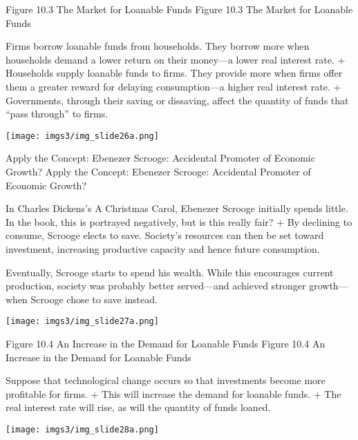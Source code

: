 \documentclass[
  12pt,
  ignorenonframetext,
]{beamer}
\begin{document}
\begin{frame}{Figure 10.3 The Market for Loanable Funds}
\protect\hypertarget{figure-10.3-the-market-for-loanable-funds}{}
Figure 10.3 The Market for Loanable Funds

Firms borrow loanable funds from households. They borrow more when
households demand a lower return on their money---a lower real interest
rate. + Households supply loanable funds to firms. They provide more
when firms offer them a greater reward for delaying consumption---a
higher real interest rate. + Governments, through their saving or
dissaving, affect the quantity of funds that ``pass through'' to firms.

\texttt{[image: imgs3/img\_slide26a.png]}
\end{frame}

\begin{frame}{Apply the Concept: Ebenezer Scrooge: Accidental Promoter
of Economic Growth?}
\protect\hypertarget{apply-the-concept-ebenezer-scrooge-accidental-promoter-of-economic-growth}{}
Apply the Concept: Ebenezer Scrooge: Accidental Promoter of Economic
Growth?

In Charles Dickens's A Christmas Carol, Ebenezer Scrooge initially
spends little. In the book, this is portrayed negatively, but is this
really fair? + By declining to consume, Scrooge elects to save.
Society's resources can then be set toward investment, increasing
productive capacity and hence future consumption.

Eventually, Scrooge starts to spend his wealth. While this encourages
current production, society was probably better served---and achieved
stronger growth---when Scrooge chose to save instead.

\texttt{[image: imgs3/img\_slide27a.png]}
\end{frame}

\begin{frame}{Figure 10.4 An Increase in the Demand for Loanable Funds}
\protect\hypertarget{figure-10.4-an-increase-in-the-demand-for-loanable-funds}{}
Figure 10.4 An Increase in the Demand for Loanable Funds

Suppose that technological change occurs so that investments become more
profitable for firms. + This will increase the demand for loanable
funds. + The real interest rate will rise, as will the quantity of funds
loaned.

\texttt{[image: imgs3/img\_slide28a.png]}
\end{frame}
\end{document}
